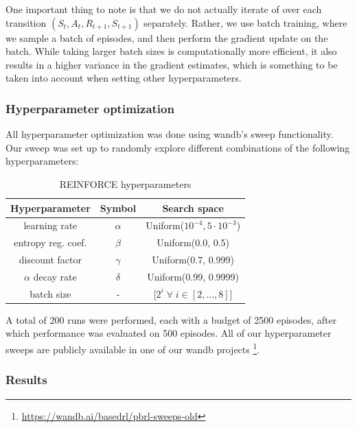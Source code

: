 \documentclass{article}
\begin{document}
One important thing to note is that we do not actually iterate of over each transition $(S_t, A_t, R_{t+1}, S_{t+1})$ separately.
Rather, we use batch training, where we sample a batch of episodes, and then perform the gradient update on the batch.
While taking larger batch sizes is computationally more efficient, it also results in a higher variance in the gradient estimates, which is something to be taken into account when setting other hyperparameters.

\subsubsection{Hyperparameter optimization}
\label{R-HPO}

All hyperparameter optimization was done using wandb's sweep functionality.
Our sweep was set up to randomly explore different combinations of the following hyperparameters:

\begin{table}[H]
    \centering
    \begin{tabular}{|c|c|c|}
        \hline
        \textbf{Hyperparameter} & \textbf{Symbol} & \textbf{Search space} \\
        \hline
        learning rate & $\alpha$ & Uniform($10^{-4}, 5 \cdot 10^{-3}$) \\
        entropy reg. coef. & $\beta$ & Uniform(0.0, 0.5) \\
        discount factor & $\gamma$ & Uniform(0.7, 0.999) \\
        $\alpha$ decay rate & $\delta$ & Uniform(0.99, 0.9999) \\
        batch size & - & [$2^i \; \forall \; i \in [2, ..., 8]$] \\
        \hline
    \end{tabular}
    \caption{REINFORCE hyperparameters}
    \label{tab:my_label}
\end{table}

A total of 200 runs were performed, each with a budget of 2500 episodes, after which performance was evaluated on 500 episodes.
All of our hyperparameter sweeps are publicly available in one of our wandb projects \footnote{\url{https://wandb.ai/basedrl/pbrl-sweeps-old}}.

\subsubsection{Results}
\label{R-Results}
\end{document}
